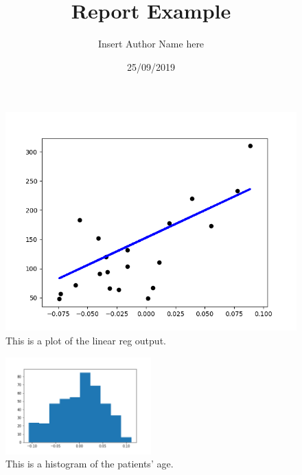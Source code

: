 \documentclass{article}%
\title{Report Example}%
\author{Insert Author Name here}%
\date{25/09/2019}%
\begin{document}
%
\normalsize%
\maketitle%
%
\newline%
\linebreak%
%
\newline%
\linebreak%
%
\newline%
\linebreak%
%
\newline%
\linebreak%


\begin{figure}[!ht]%
\centering%
\includegraphics[scale=0.6]{../figures/Figure1.png}%
\linebreak%
\caption{This is a plot of the linear reg output.}%
\end{figure}

%
\newline%
\linebreak%


\begin{figure}[!ht]%
\centering%
\includegraphics[width=0.5\textwidth]{../figures/Figure2.png}%
\linebreak%
\caption{This is a histogram of the patients' age.}%
\end{figure}

%
\newline%
\linebreak%
%
\newline%
\linebreak%
%
\newline%
\linebreak%
%
\newline%
\linebreak%
\clearpage%
\end{document}
